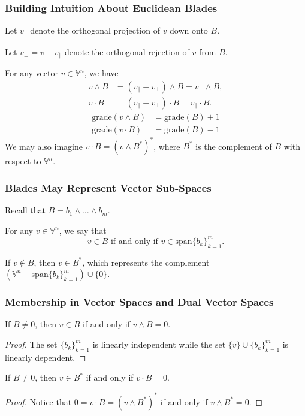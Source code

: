 \documentclass{beamer}
\newcommand{\V}{\mathbb{V}}
\newcommand{\grade}{\mbox{grade}}
\begin{document}
\begin{frame}
\frametitle{Building Intuition About Euclidean Blades}
Let $v_{\parallel}$ denote the orthogonal \alert{projection} of $v$ down onto $B$.\pause

Let $v_{\perp}=v-v_{\parallel}$ denote the orthogonal \alert{rejection} of $v$ from $B$.\pause

For any vector $v\in\V^n$, we have
\begin{align*}
v\wedge B &= (v_{\parallel} + v_{\perp})\wedge B = v_{\perp}\wedge B, \\
v\cdot B &= (v_{\parallel} + v_{\perp})\cdot B = v_{\parallel}\cdot B.
\end{align*}\pause
\begin{align*}
\grade(v\wedge B) &= \grade(B) + 1 \\
\grade(v\cdot B) &= \grade(B) - 1
\end{align*}\pause
We may also imagine $v\cdot B=(v\wedge B^*)^*$, where $B^*$ is the \alert{complement}
of $B$ with respect to $\V^n$.
\end{frame}

\begin{frame}
\frametitle{Blades May Represent Vector Sub-Spaces}
Recall that $B = b_1\wedge\dots\wedge b_m$.\pause
\begin{definition}
For any $v\in\V^n$, we say that
\begin{equation*}
\mbox{$v\in B$ if and only if $v\in\mbox{span}\{b_k\}_{k=1}^m$}.
\end{equation*}
\end{definition}\pause
\begin{definition}
If $v\not\in B$, then $v\in B^*$, which represents the complement $(\V^n-\mbox{span}\{b_k\}_{k=1}^m)\cup\{0\}$.
\end{definition}
\end{frame}

\begin{frame}
\frametitle{Membership in Vector Spaces and Dual Vector Spaces}
If $B\neq 0$, then $v\in B$ if and only if $v\wedge B=0$.\pause
\begin{proof}
The set $\{b_k\}_{k=1}^m$ is linearly independent while the set $\{v\}\cup\{b_k\}_{k=1}^m$ is linearly dependent.
\end{proof}\pause
If $B\neq 0$, then $v\in B^*$ if and only if $v\cdot B=0$.\pause
\begin{proof}
Notice that $0=v\cdot B=(v\wedge B^*)^*$ if and only if $v\wedge B^*=0$.
\end{proof}
\end{frame}
\end{document}

